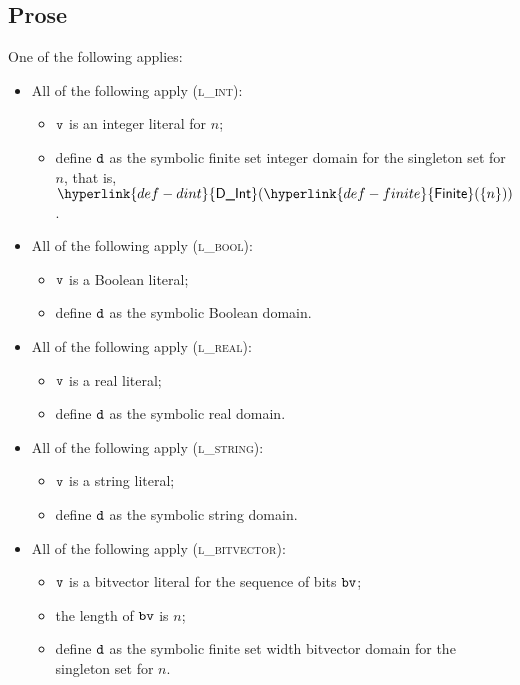 \documentclass{book}
\newcommand\DInt[0]{\hyperlink{def-dint}{\textsf{D\_Int}}}
\newcommand\Finite[0]{\hyperlink{def-finite}{\textsf{Finite}}}
\begin{document}
\subsection{Prose}
One of the following applies:
\begin{itemize}
  \item All of the following apply (\textsc{l\_int}):
  \begin{itemize}
    \item $\texttt{v}$ is an integer literal for $n$;
    \item define $\texttt{d}$ as the symbolic finite set integer domain for the singleton set for $n$, that is, $\DInt(\Finite(\{n\}))$.
  \end{itemize}

  \item All of the following apply (\textsc{l\_bool}):
  \begin{itemize}
    \item $\texttt{v}$ is a Boolean literal;
    \item define $\texttt{d}$ as the symbolic Boolean domain.
  \end{itemize}

  \item All of the following apply (\textsc{l\_real}):
  \begin{itemize}
    \item $\texttt{v}$ is a real literal;
    \item define $\texttt{d}$ as the symbolic real domain.
  \end{itemize}

  \item All of the following apply (\textsc{l\_string}):
  \begin{itemize}
    \item $\texttt{v}$ is a string literal;
    \item define $\texttt{d}$ as the symbolic string domain.
  \end{itemize}

  \item All of the following apply (\textsc{l\_bitvector}):
  \begin{itemize}
    \item $\texttt{v}$ is a bitvector literal for the sequence of bits $\texttt{bv}$;
    \item the length of $\texttt{bv}$ is $n$;
    \item define $\texttt{d}$ as the symbolic finite set width bitvector domain for the singleton set for $n$.
  \end{itemize}
\end{itemize}
\end{document}
